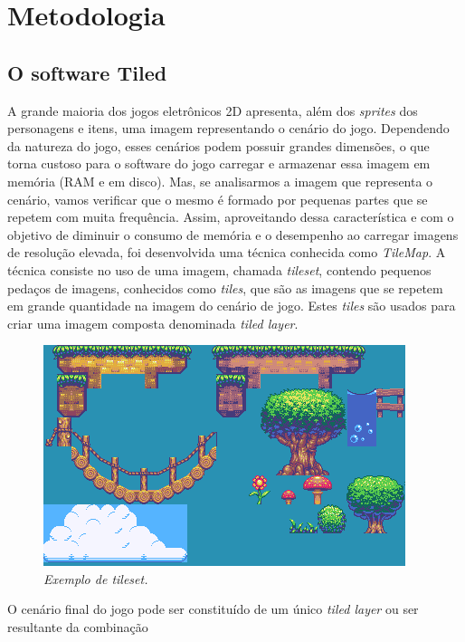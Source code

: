 \chapter{Metodologia}
\label{cap:revisao}
%
%
\section{O software Tiled}
\label{tiled}
%
A grande maioria dos jogos eletrônicos 2D apresenta, além dos \textit{sprites} dos personagens e itens, uma imagem representando o cenário do jogo. Dependendo da natureza do jogo, esses cenários podem possuir grandes dimensões, o que torna custoso para o software do jogo carregar e 
armazenar essa imagem em memória (RAM e em disco). Mas, se analisarmos a imagem que representa o cenário, vamos verificar que o mesmo é formado
por pequenas partes que se repetem com muita frequência. Assim, aproveitando dessa característica e com o objetivo de diminuir o consumo de
memória e o desempenho ao carregar imagens de resolução elevada, foi desenvolvida uma técnica conhecida como \textit{TileMap}. A técnica
consiste no uso de uma imagem, chamada \textit{tileset}, contendo pequenos pedaços de imagens, conhecidos como \textit{tiles}, que são
as imagens que se repetem em grande quantidade na imagem do cenário de jogo. Estes \textit{tiles} são usados 
para criar uma imagem composta denominada \textit{tiled layer}.
%
%
\begin{figure}[H]
    \centering
    \includegraphics[scale = 1.0]{Imagens/tileset_edit.png}
    \caption{\textit{Exemplo de \textit{tileset}.}}
    \label{tileset_example}
\end{figure}
%
\par
%
O cenário final do jogo pode ser constituído de um único \textit{tiled layer} ou ser resultante da combinação 
